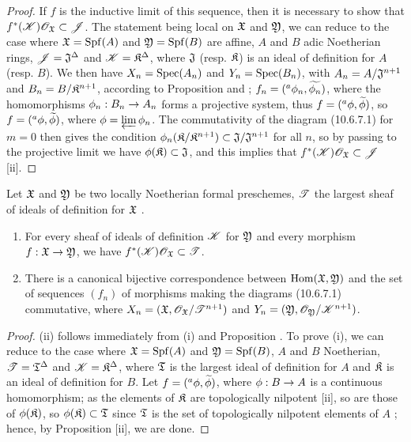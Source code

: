 \begin{proof}
\label{proof-1.10.6.9}
If $f$ is the inductive limit of this sequence, then it is necessary to show that $f^*(\mathscr{K})\mathscr{O}_\mathfrak{X}\subset\mathscr{J}$.
The statement being local on $\mathfrak{X}$ and $\mathfrak{Y}$, we can reduce to the case where $\mathfrak{X}={\mathop{\mathrm{Spf}}\nolimits}(A)$ and $\mathfrak{Y}={\mathop{\mathrm{Spf}}\nolimits}(B)$ are affine, $A$ and $B$ adic Noetherian rings, $\mathscr{J}=\mathfrak{J}^\Delta$ and $\mathscr{K}=\mathfrak{K}^\Delta$, where $\mathfrak{J}$ (resp. $\mathfrak{K}$) is an ideal of definition for $A$ (resp. $B$).
We then have $X_n={\mathop{\mathrm{Spec}}\nolimits}(A_n)$ and $Y_n={\mathop{\mathrm{Spec}}\nolimits}(B_n)$, with $A_n=A/\mathfrak{J}^{n+1}$ and $B_n=B/\mathfrak{K}^{n+1}$, according to Proposition  and ; $f_n=({}^a\phi_n,\widetilde{\phi_n})$, where the homomorphisms $\vphi_n:B_n\to A_n$ forms a projective system, thus $f=({}^a\phi,\widetilde{\phi})$, so $f=({}^a\phi,\widetilde{\phi})$, where $\phi=\varprojlim\phi_n$.
The commutativity of the diagram (10.6.7.1) for $m=0$ then gives the condition $\phi_n(\mathfrak{K}/\mathfrak{K}^{n+1})\subset\mathfrak{J}/\mathfrak{J}^{n+1}$ for all $n$, so by passing to the projective limit we have $\phi(\mathfrak{K})\subset\mathfrak{J}$, and this implies that $f^*(\mathscr{K})\mathscr{O}_\mathfrak{X}\subset\mathscr{J}$ [ii].
\end{proof}

\begin{cor}[10.6.10]
\label{1.10.6.10}
Let $\mathfrak{X}$ and $\mathfrak{Y}$ be two locally Noetherian formal preschemes, $\mathscr{T}$ the largest sheaf of ideals of definition for $\mathfrak{X}$ .
\begin{enumerate}[label=\emph{(\roman*)}]
  \item For every sheaf of ideals of definition $\mathscr{K}$ for $\mathfrak{Y}$ and every morphism $f:\fk{X}\to\fk{Y}$, we have $f^*(\mathscr{K})\mathscr{O}_\mathfrak{X}\subset\mathscr{T}$.
  \item There is a canonical bijective correspondence between ${\mathop{\mathrm{Hom}}\nolimits}(\mathfrak{X},\mathfrak{Y})$ and the set of sequences $(f_n)$ of morphisms making the diagrams (10.6.7.1) commutative, where $X_n=(\mathfrak{X},\mathscr{O}_\mathfrak{X}/\mathscr{T}^{n+1})$ and $Y_n=(\mathfrak{Y},\mathscr{O}_\mathfrak{Y}/\mathscr{K}^{n+1})$.
\end{enumerate}
\end{cor}

\begin{proof}
\label{proof-1.10.6.10}
(ii) follows immediately from (i) and Proposition .
To prove (i), we can reduce to the case where $\mathfrak{X}={\mathop{\mathrm{Spf}}\nolimits}(A)$ and $\mathfrak{Y}={\mathop{\mathrm{Spf}}\nolimits}(B)$, $A$ and $B$ Noetherian, $\mathscr{T}=\mathfrak{T}^\Delta$ and $\mathscr{K}=\mathfrak{K}^\Delta$, where $\mathfrak{T}$ is the largest ideal of definition for $A$ and $\mathfrak{K}$ is an ideal of definition for $B$.
Let $f=({}^a\phi,\widetilde{\phi})$, where $\vphi:B\to A$ is a continuous homomorphism; as the elements of $\mathfrak{K}$ are topologically nilpotent [ii], so are those of $\phi(\mathfrak{K})$, so $\phi(\mathfrak{K})\subset\mathfrak{T}$ since $\mathfrak{T}$ is the set of topologically nilpotent elements of $A$ ; hence, by Proposition [ii], we are done.
\end{proof}

